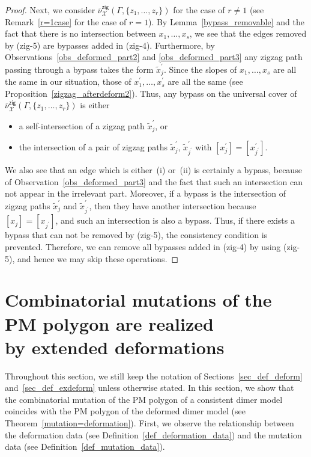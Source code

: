 \documentclass[pdftex]{sigma}%
\numberwithin{equation}{section}
\numberwithin{figure}{section}
\numberwithin{table}{section}
\newcommand{\calX}{\mathcal{X}}
\newcommand{\zig}{\mathsf{zig}}
\begin{document}
\begin{proof}
Next, we consider $\overline{\nu}_\calX^\zig(\Gamma,\{z_1,\dots,z_r\})$ for the case of $r\neq1$ (see Remark~\ref{r=1case} for the case of $r=1$).
By Lemma~\ref{bypass_removable} and the fact that there is no intersection between $x_1,\dots,x_s$, we see that the edges removed by (zig-5) are bypasses added in (zig-4).
Furthermore, by Observations~\ref{obs_deformed_part2} and \ref{obs_deformed_part3} any zigzag path passing through a bypass takes the form $\widetilde{x}_j^\prime$.
Since the slopes of $x_1,\dots,x_s$ are all the same in our situation, those of $x_1^\prime, \dots, x_s^\prime$ are all the same (see Proposition~\ref{zigzag_afterdeform2}).
Thus, any bypass on the universal cover of $\overline{\nu}_\calX^\zig(\Gamma,\{z_1,\dots,z_r\})$ is either
\begin{itemize}\itemsep=0pt
\item[\rm (i)] a self-intersection of a zigzag path $\widetilde{x}_j^\prime$, or
\item[\rm (ii)] the intersection of a pair of zigzag paths $\widetilde{x}_j^\prime$, $\widetilde{x}_{j^\prime}^\prime$ with $[x_j^\prime]=[x_{j^\prime}^\prime]$.
\end{itemize}
We also see that an edge which is either~(i) or~(ii) is certainly a bypass, because of Observation~\ref{obs_deformed_part3} and the fact that such an intersection can not appear in the irrelevant part.
Moreover, if a bypass is the intersection of zigzag paths $\widetilde{x}_j^\prime$ and $\widetilde{x}_{j^\prime}^\prime$, then they have another intersection because $[x_j]=[x_{j^\prime}]$, and such an intersection is also a bypass.
Thus, if there exists a bypass that can not be removed by (zig-5), the consistency condition is prevented.
Therefore, we can remove all bypasses added in (zig-4) by using (zig-5), and hence we may skip these operations.
\end{proof}

\section[Combinatorial mutations of the PM polygon are realized\\ by extended deformations]{Combinatorial mutations of the PM polygon are realized\\ by extended deformations}
\label{mutation_vs_deformation}

Throughout this section, we still keep the notation of Sections~\ref{sec_def_deform} and~\ref{sec_def_exdeform} unless otherwise stated.
In this section, we show that the combinatorial mutation of the PM polygon of a consistent dimer model coincides with the PM polygon of the deformed dimer model (see Theorem~\ref{mutation=deformation}).
First, we observe the relationship between the deformation data (see Definition~\ref{def_deformation_data}) and the mutation data (see Definition~\ref{def_mutation_data}).
\end{document}
